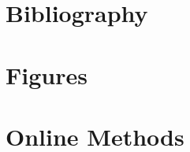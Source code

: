 \documentclass[11pt]{article}
\begin{document}

\maketitle









\section*{Bibliography}
\printbibliography

\section*{Figures}


\newpage
\section*{Online Methods}







\end{document}

